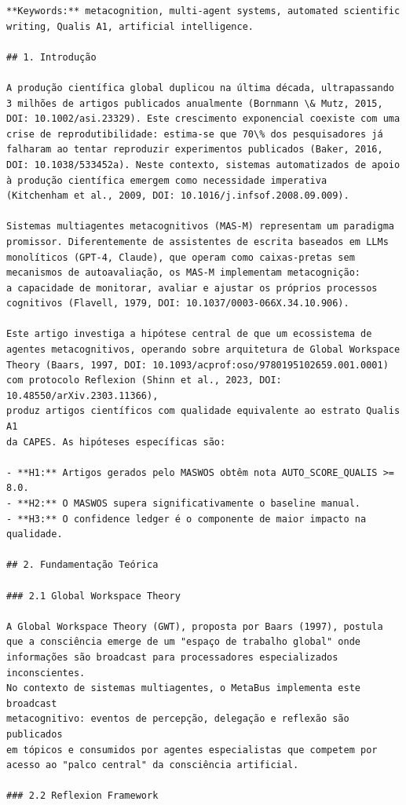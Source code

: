 \begin{lstlisting}[caption={Artigo exemplo gerado pelo MASWOS (excerto da introdução e metodologia)},label={lst:artigo-exemplo}]
**Keywords:** metacognition, multi-agent systems, automated scientific
writing, Qualis A1, artificial intelligence.

## 1. Introdução

A produção científica global duplicou na última década, ultrapassando
3 milhões de artigos publicados anualmente (Bornmann \& Mutz, 2015,
DOI: 10.1002/asi.23329). Este crescimento exponencial coexiste com uma
crise de reprodutibilidade: estima-se que 70\% dos pesquisadores já
falharam ao tentar reproduzir experimentos publicados (Baker, 2016,
DOI: 10.1038/533452a). Neste contexto, sistemas automatizados de apoio
à produção científica emergem como necessidade imperativa
(Kitchenham et al., 2009, DOI: 10.1016/j.infsof.2008.09.009).

Sistemas multiagentes metacognitivos (MAS-M) representam um paradigma
promissor. Diferentemente de assistentes de escrita baseados em LLMs
monolíticos (GPT-4, Claude), que operam como caixas-pretas sem
mecanismos de autoavaliação, os MAS-M implementam metacognição:
a capacidade de monitorar, avaliar e ajustar os próprios processos
cognitivos (Flavell, 1979, DOI: 10.1037/0003-066X.34.10.906).

Este artigo investiga a hipótese central de que um ecossistema de
agentes metacognitivos, operando sobre arquitetura de Global Workspace
Theory (Baars, 1997, DOI: 10.1093/acprof:oso/9780195102659.001.0001)
com protocolo Reflexion (Shinn et al., 2023, DOI: 10.48550/arXiv.2303.11366),
produz artigos científicos com qualidade equivalente ao estrato Qualis A1
da CAPES. As hipóteses específicas são:

- **H1:** Artigos gerados pelo MASWOS obtêm nota AUTO_SCORE_QUALIS >= 8.0.
- **H2:** O MASWOS supera significativamente o baseline manual.
- **H3:** O confidence ledger é o componente de maior impacto na qualidade.

## 2. Fundamentação Teórica

### 2.1 Global Workspace Theory

A Global Workspace Theory (GWT), proposta por Baars (1997), postula
que a consciência emerge de um "espaço de trabalho global" onde
informações são broadcast para processadores especializados inconscientes.
No contexto de sistemas multiagentes, o MetaBus implementa este broadcast
metacognitivo: eventos de percepção, delegação e reflexão são publicados
em tópicos e consumidos por agentes especialistas que competem por
acesso ao "palco central" da consciência artificial.

### 2.2 Reflexion Framework


\end{lstlisting}
